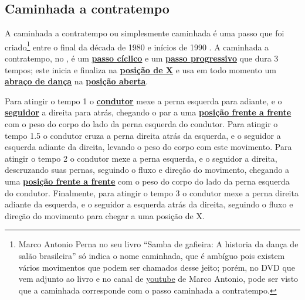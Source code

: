 \subsection{Caminhada a contratempo}
A caminhada a contratempo ou simplesmente caminhada é
uma passo que foi  criado\footnote{Marco Antonio Perna no seu livro 
``Samba de gafieira: A historia da dança de salão brasileira''
só indica o nome caminhada, que é ambíguo pois existem vários 
movimentos que podem ser chamados desse jeito; porém, no
DVD que vem adjunto ao livro e no canal de 
\href{https://www.youtube.com/watch?v=Bke_poU6NBc}{youtube} de Marco Antonio,
pode ser visto que a caminhada corresponde com o passo caminhada a contratempo.} 
entre o final da década de 1980 e inícios de 1990  \cite[pp. 143]{perna2002samba}.
A caminhada a contratempo, no \AnoLivro, 
é um \hyperref[def:PassoCiclico]{\textbf{passo cíclico}} e 
um \hyperref[def:PassoDeDeslocamento]{\textbf{passo progressivo}} que dura 3 tempos;
este inicia e finaliza na \hyperref[def:X-position]{\textbf{posição de X}} e usa em todo momento 
um \hyperref[def:abracodedanca]{\textbf{abraço de dança}} na 
\hyperref[def:open-position]{\textbf{posição aberta}}.

Para atingir o tempo 1 o \hyperref[def:Condutor]{\textbf{condutor}} mexe a perna esquerda para adiante, 
e o \hyperref[def:Seguidor]{\textbf{seguidor}}  a direita para atrás,
chegando o par a uma \hyperref[def:frente-frente-position]{\textbf{posição frente a frente}}
com o peso do corpo do lado da perna esquerda do condutor.
Para atingir o tempo 1.5 o condutor cruza a perna direita atrás da esquerda,
e o seguidor a esquerda adiante da direita, levando o peso do corpo com este movimento.
Para atingir o tempo 2 o condutor mexe a perna esquerda, e o seguidor a direita,
descruzando suas pernas, seguindo o fluxo e direção do movimento,
chegando a uma \hyperref[def:frente-frente-position]{\textbf{posição frente a frente}}
com o peso do corpo do lado da perna esquerda do condutor.
Finalmente, para atingir o tempo 3 o condutor mexe a perna direita adiante da esquerda,
e o seguidor a esquerda atrás da direita, 
seguindo o fluxo e direção do movimento para chegar a uma posição de X. 

